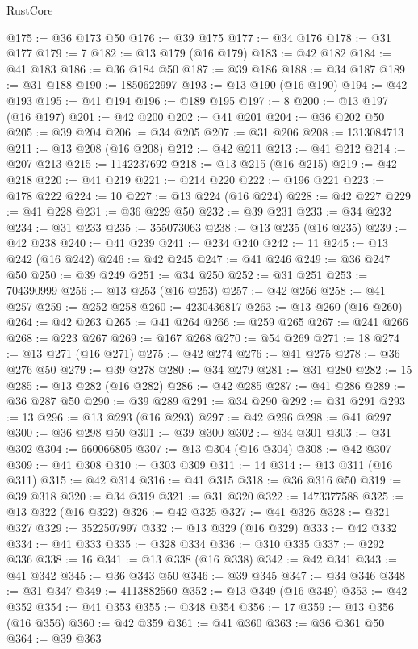 \begin{lexlean}{RustCore}
\begin{coremodule}
@175 := @36 @173 @50
@176 := @39 @175
@177 := @34 @176
@178 := @31 @177
@179 := 7
@182 := @13 @179 (@16 @179)
@183 := @42 @182
@184 := @41 @183
@186 := @36 @184 @50
@187 := @39 @186
@188 := @34 @187
@189 := @31 @188
@190 := 1850622997
@193 := @13 @190 (@16 @190)
@194 := @42 @193
@195 := @41 @194
@196 := @189 @195
@197 := 8
@200 := @13 @197 (@16 @197)
@201 := @42 @200
@202 := @41 @201
@204 := @36 @202 @50
@205 := @39 @204
@206 := @34 @205
@207 := @31 @206
@208 := 1313084713
@211 := @13 @208 (@16 @208)
@212 := @42 @211
@213 := @41 @212
@214 := @207 @213
@215 := 1142237692
@218 := @13 @215 (@16 @215)
@219 := @42 @218
@220 := @41 @219
@221 := @214 @220
@222 := @196 @221
@223 := @178 @222
@224 := 10
@227 := @13 @224 (@16 @224)
@228 := @42 @227
@229 := @41 @228
@231 := @36 @229 @50
@232 := @39 @231
@233 := @34 @232
@234 := @31 @233
@235 := 355073063
@238 := @13 @235 (@16 @235)
@239 := @42 @238
@240 := @41 @239
@241 := @234 @240
@242 := 11
@245 := @13 @242 (@16 @242)
@246 := @42 @245
@247 := @41 @246
@249 := @36 @247 @50
@250 := @39 @249
@251 := @34 @250
@252 := @31 @251
@253 := 704390999
@256 := @13 @253 (@16 @253)
@257 := @42 @256
@258 := @41 @257
@259 := @252 @258
@260 := 4230436817
@263 := @13 @260 (@16 @260)
@264 := @42 @263
@265 := @41 @264
@266 := @259 @265
@267 := @241 @266
@268 := @223 @267
@269 := @167 @268
@270 := @54 @269
@271 := 18
@274 := @13 @271 (@16 @271)
@275 := @42 @274
@276 := @41 @275
@278 := @36 @276 @50
@279 := @39 @278
@280 := @34 @279
@281 := @31 @280
@282 := 15
@285 := @13 @282 (@16 @282)
@286 := @42 @285
@287 := @41 @286
@289 := @36 @287 @50
@290 := @39 @289
@291 := @34 @290
@292 := @31 @291
@293 := 13
@296 := @13 @293 (@16 @293)
@297 := @42 @296
@298 := @41 @297
@300 := @36 @298 @50
@301 := @39 @300
@302 := @34 @301
@303 := @31 @302
@304 := 660066805
@307 := @13 @304 (@16 @304)
@308 := @42 @307
@309 := @41 @308
@310 := @303 @309
@311 := 14
@314 := @13 @311 (@16 @311)
@315 := @42 @314
@316 := @41 @315
@318 := @36 @316 @50
@319 := @39 @318
@320 := @34 @319
@321 := @31 @320
@322 := 1473377588
@325 := @13 @322 (@16 @322)
@326 := @42 @325
@327 := @41 @326
@328 := @321 @327
@329 := 3522507997
@332 := @13 @329 (@16 @329)
@333 := @42 @332
@334 := @41 @333
@335 := @328 @334
@336 := @310 @335
@337 := @292 @336
@338 := 16
@341 := @13 @338 (@16 @338)
@342 := @42 @341
@343 := @41 @342
@345 := @36 @343 @50
@346 := @39 @345
@347 := @34 @346
@348 := @31 @347
@349 := 4113882560
@352 := @13 @349 (@16 @349)
@353 := @42 @352
@354 := @41 @353
@355 := @348 @354
@356 := 17
@359 := @13 @356 (@16 @356)
@360 := @42 @359
@361 := @41 @360
@363 := @36 @361 @50
@364 := @39 @363

\end{coremodule}
\end{lexlean}
